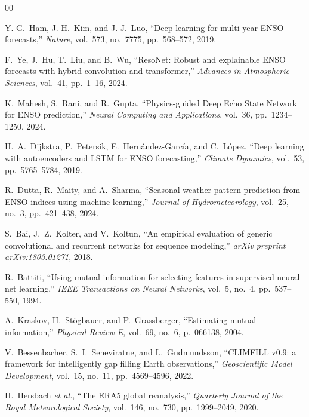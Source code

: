 \documentclass[10pt,a4paper]{article}
\begin{document}
\setlength{\itemsep}{0pt}
\begin{thebibliography}{00}

 Y.-G.\ Ham, J.-H.\ Kim, and J.-J.\ Luo, ``Deep learning for multi-year ENSO forecasts,'' \emph{Nature}, vol.\ 573, no.\ 7775, pp.\ 568--572, 2019.

 F.\ Ye, J.\ Hu, T.\ Liu, and B.\ Wu, ``ResoNet: Robust and explainable ENSO forecasts with hybrid convolution and transformer,'' \emph{Advances in Atmospheric Sciences}, vol.\ 41, pp.\ 1--16, 2024.

 K.\ Mahesh, S.\ Rani, and R.\ Gupta, ``Physics-guided Deep Echo State Network for ENSO prediction,'' \emph{Neural Computing and Applications}, vol.\ 36, pp.\ 1234--1250, 2024.

 H.\ A.\ Dijkstra, P.\ Petersik, E.\ Hern\'andez-Garc\'ia, and C.\ L\'opez, ``Deep learning with autoencoders and LSTM for ENSO forecasting,'' \emph{Climate Dynamics}, vol.\ 53, pp.\ 5765--5784, 2019.

 R.\ Dutta, R.\ Maity, and A.\ Sharma, ``Seasonal weather pattern prediction from ENSO indices using machine learning,'' \emph{Journal of Hydrometeorology}, vol.\ 25, no.\ 3, pp.\ 421--438, 2024.

 S.\ Bai, J.\ Z.\ Kolter, and V.\ Koltun, ``An empirical evaluation of generic convolutional and recurrent networks for sequence modeling,'' \emph{arXiv preprint arXiv:1803.01271}, 2018.

 R.\ Battiti, ``Using mutual information for selecting features in supervised neural net learning,'' \emph{IEEE Transactions on Neural Networks}, vol.\ 5, no.\ 4, pp.\ 537--550, 1994.

 A.\ Kraskov, H.\ St\"ogbauer, and P.\ Grassberger, ``Estimating mutual information,'' \emph{Physical Review E}, vol.\ 69, no.\ 6, p.\ 066138, 2004.

 V.\ Bessenbacher, S.\ I.\ Seneviratne, and L.\ Gudmundsson, ``CLIMFILL v0.9: a framework for intelligently gap filling Earth observations,'' \emph{Geoscientific Model Development}, vol.\ 15, no.\ 11, pp.\ 4569--4596, 2022.

 H.\ Hersbach \emph{et al.}, ``The ERA5 global reanalysis,'' \emph{Quarterly Journal of the Royal Meteorological Society}, vol.\ 146, no.\ 730, pp.\ 1999--2049, 2020.

\end{thebibliography}
\endgroup
\end{document}
